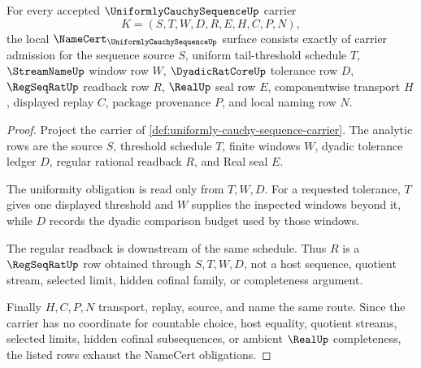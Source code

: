 \begin{theorem}
\label{thm:uniformly-cauchy-sequence-namecert-obligations}
For every accepted $\UniformlyCauchySequenceUp$ carrier
$$
K=(S,T,W,D,R,E,H,C,P,N),
$$
the local $\NameCert_{\UniformlyCauchySequenceUp}$ surface consists exactly of carrier admission for the sequence source $S$, uniform tail-threshold schedule $T$, $\StreamNameUp$ window row $W$, $\DyadicRatCoreUp$ tolerance row $D$, $\RegSeqRatUp$ readback row $R$, $\RealUp$ seal row $E$, componentwise transport $H$, displayed replay $C$, package provenance $P$, and local naming row $N$.
\end{theorem}
\begin{proof}
Project the carrier of \autoref{def:uniformly-cauchy-sequence-carrier}. The analytic rows are the source $S$, threshold schedule $T$, finite windows $W$, dyadic tolerance ledger $D$, regular rational readback $R$, and Real seal $E$.

The uniformity obligation is read only from $T,W,D$. For a requested tolerance, $T$ gives one displayed threshold and $W$ supplies the inspected windows beyond it, while $D$ records the dyadic comparison budget used by those windows.

The regular readback is downstream of the same schedule. Thus $R$ is a $\RegSeqRatUp$ row obtained through $S,T,W,D$, not a host sequence, quotient stream, selected limit, hidden cofinal family, or completeness argument.

Finally $H,C,P,N$ transport, replay, source, and name the same route. Since the carrier has no coordinate for countable choice, host equality, quotient streams, selected limits, hidden cofinal subsequences, or ambient $\RealUp$ completeness, the listed rows exhaust the NameCert obligations.
\end{proof}

